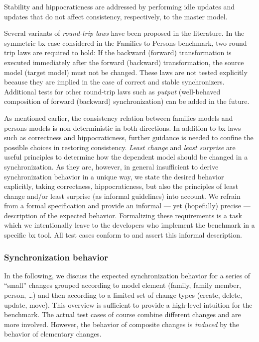 Stability and hippocraticness are addressed by performing idle updates and updates that do not affect consistency, respectively, to the master model.

Several variants of \emph{round-trip laws} have been proposed in the literature. In the symmetric bx case considered in the Families to Persons benchmark, two round-trip laws are required to hold: If the backward (forward) transformation is executed immediately after the forward (backward) transformation, the source model (target model) must not be changed. These laws are not tested explicitly because they are implied in the case of correct and stable synchronizers.
Additional tests for other round-trip laws such as \emph{putput} (well-behaved composition of forward (backward) synchronization) can be added in the future.

As mentioned earlier, the consistency relation between families models and persons models is non-de\-ter\-min\-istic in both directions.
In addition to bx laws such as correctness and hippocraticness, further guidance is needed to confine the possible choices in restoring consistency.
\emph{Least change} and \emph{least surprise} are useful principles to determine how the dependent model should be changed in a synchronization.
As they are, however, in general insufficient to derive synchronization behavior in a unique way, we state the desired behavior explicitly, taking correctness, hippocraticness, but also the principles of least change and/or least surprise (as informal guidelines) into account. 
We refrain from a formal specification and provide an informal --- yet (hopefully) precise --- description of the expected behavior.
Formalizing these requirements is a task which we intentionally leave to the developers who implement the benchmark in a specific bx tool. 
All test cases conform to and assert this informal description.

\subsubsection{Synchronization behavior}      

In the following, we discuss the expected synchronization behavior for a series of ``small'' changes grouped according to model element (family, family member, person, \ldots) and then according to a limited set of change types (create, delete, update, move).
This overview is sufficient to provide a high-level intuition for the benchmark.
The actual test cases of course combine different changes and are more involved. However, the behavior of composite changes is \emph{induced} by the behavior of elementary changes.

